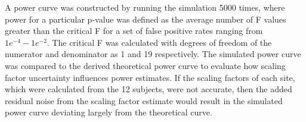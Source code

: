 A power curve was constructed by running the simulation 5000 times, where power for a particular p-value was defined as the average number of F values greater than the critical F for a set of false positive rates ranging from $1e^{-4} - 1e^{-2}$. The critical F was calculated with degrees of freedom of the numerator and denominator as 1 and 19 respectively. The simulated power curve was compared to the derived theoretical power curve to evaluate how scaling factor uncertainty influences power estimates. If the scaling factors of each site, which were calculated from the 12 subjects, were not accurate, then the added residual noise from the scaling factor estimate would result in the simulated power curve deviating largely from the theoretical curve.